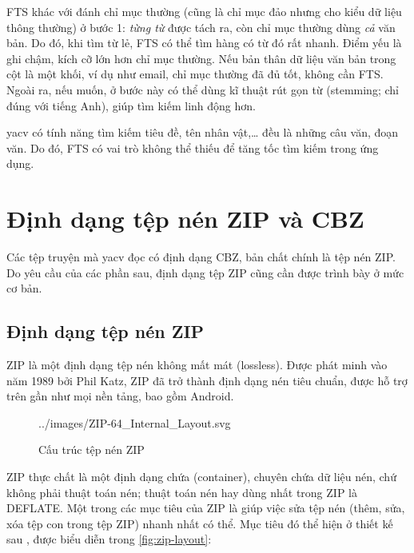 \documentclass[../../thesis]{subfiles}
\begin{document}
FTS khác với đánh chỉ mục thường (cũng là chỉ mục đảo nhưng cho kiểu dữ liệu
thông thường) ở bước 1: \emph{từng từ} được tách ra, còn chỉ mục thường dùng
\emph{cả} văn bản. Do đó, khi tìm từ lẻ, FTS có thể tìm hàng có từ đó rất nhanh.
Điểm yếu là ghi chậm, kích cỡ lớn hơn chỉ mục thường. Nếu bản thân dữ liệu văn
bản trong cột là một khối, ví dụ như email, chỉ mục thường đã đủ tốt, không cần
FTS. Ngoài ra, nếu muốn, ở bước này có thể dùng kĩ thuật rút gọn từ (stemming;
chỉ đúng với tiếng Anh), giúp tìm kiếm linh động hơn.

yacv có tính năng tìm kiếm tiêu đề, tên nhân vật,\ldots{} đều là những câu văn,
đoạn văn. Do đó, FTS có vai trò không thể thiếu để tăng tốc tìm kiếm trong ứng
dụng.



\section{Định dạng tệp nén ZIP và CBZ}\label{sec:zip-cbz}

Các tệp truyện mà yacv đọc có định dạng CBZ, bản chất chính là tệp nén ZIP. Do
yêu cầu của các phần sau, định dạng tệp ZIP cũng cần được trình bày ở mức cơ
bản.

\subsection{Định dạng tệp nén ZIP}\label{sec:zip}

ZIP là một định dạng tệp nén không mất mát (lossless). Được phát minh vào năm
1989 bởi Phil Katz, ZIP đã trở thành định dạng nén tiêu chuẩn, được hỗ trợ trên
gần như mọi nền tảng, bao gồm Android.

\begin{figure}
    \centering
    \vspace*{-6mm}
    
        {../images/ZIP-64_Internal_Layout.svg}
    \caption{Cấu trúc tệp nén ZIP \cite{WIKI_ZIP}}
    \label{fig:zip-layout}
\end{figure}

ZIP thực chất là một định dạng chứa (container), chuyên chứa dữ liệu nén, chứ
không phải thuật toán nén; thuật toán nén hay dùng nhất trong ZIP là DEFLATE.
Một trong các mục tiêu của ZIP là giúp việc sửa tệp nén (thêm, sửa, xóa tệp con
trong tệp ZIP) nhanh nhất có thể. Mục tiêu đó thể hiện ở thiết kế sau
\cite{PKWARE_APPNOTE}, được biểu diễn trong \autoref{fig:zip-layout}:
\end{document}
